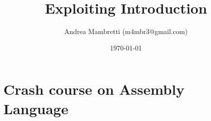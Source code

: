 \documentclass[]{beamer}
\title{Exploiting Introduction}    %
\author{Andrea Mambretti (m4mbr3@gmail.com)}        %
\institute{Politecnico di Milano}      %
\date{\today}                    %
\begin{document}
\begin{frame}
  \titlepage
\end{frame}

\section[Outline]{}

\begin{frame}
  \tableofcontents
\end{frame}
\section {Crash course on Assembly Language}
\end{document}
